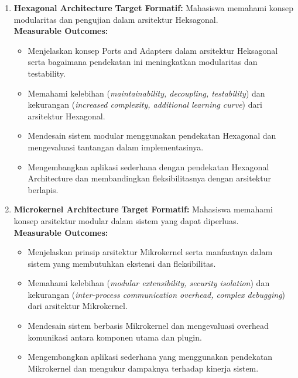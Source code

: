 \begin{enumerate}
\item \textbf{Hexagonal Architecture}  
\textbf{Target Formatif:} Mahasiswa memahami konsep modularitas dan pengujian dalam arsitektur Heksagonal.  \\
\textbf{Measurable Outcomes:}
\begin{itemize}
\item Menjelaskan konsep Ports and Adapters dalam arsitektur Heksagonal serta bagaimana pendekatan ini meningkatkan modularitas dan testability.
\item Memahami kelebihan (\textit{maintainability, decoupling, testability}) dan kekurangan (\textit{increased complexity, additional learning curve}) dari arsitektur Hexagonal.
\item Mendesain sistem modular menggunakan pendekatan Hexagonal dan mengevaluasi tantangan dalam implementasinya.
\item Mengembangkan aplikasi sederhana dengan pendekatan Hexagonal Architecture dan membandingkan fleksibilitasnya dengan arsitektur berlapis.
\end{itemize}

\item \textbf{Microkernel Architecture}  
\textbf{Target Formatif:} Mahasiswa memahami konsep arsitektur modular dalam sistem yang dapat diperluas.  \\
\textbf{Measurable Outcomes:}
\begin{itemize}
\item Menjelaskan prinsip arsitektur Mikrokernel serta manfaatnya dalam sistem yang membutuhkan ekstensi dan fleksibilitas.
\item Memahami kelebihan (\textit{modular extensibility, security isolation}) dan kekurangan (\textit{inter-process communication overhead, complex debugging}) dari arsitektur Mikrokernel.
\item Mendesain sistem berbasis Mikrokernel dan mengevaluasi overhead komunikasi antara komponen utama dan plugin.
\item Mengembangkan aplikasi sederhana yang menggunakan pendekatan Mikrokernel dan mengukur dampaknya terhadap kinerja sistem.
\end{itemize}


\end{enumerate}

